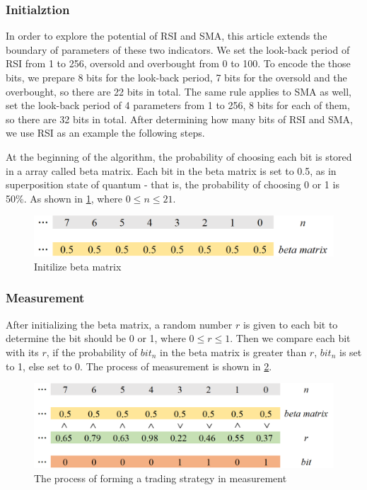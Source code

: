 \documentclass[../main.tex]{subfiles}
\begin{document}
\subsubsection{Initialztion}

In order to explore the potential of RSI and SMA, this article extends the boundary of parameters of these two indicators. We set the look-back period of RSI from 1 to 256, oversold and overbought from 0 to 100. To encode the those bits, we prepare 8 bits for the look-back period, 7 bits for the oversold and the overbought, so there are 22 bits in total. The same rule applies to SMA as well, set the look-back period of 4 parameters from 1 to 256, 8 bits for each of them, so there are 32 bits in total. After determining how many bits of RSI and SMA, we use RSI as an example the following steps.

\bigbreak

At the beginning of the algorithm, the probability of choosing each bit is stored in a array called beta matrix. Each bit in the beta matrix is set to 0.5, as in superposition state of quantum - that is, the probability of choosing 0 or 1 is 50\%. As shown in \ref{init}, where $0 \leq n \leq 21$.

\begin{figure}[H]
    \centering
    \includegraphics[scale = 0.5] {figure/init.png}
    \caption{Initilize beta matrix}
    \label{init}
\end{figure}

\subsubsection{Measurement}

After initializing the beta matrix, a random number $r$ is given to each bit to determine the bit should be 0 or 1, where $0 \leq r \leq 1$. Then we compare each bit with its $r$, if the probability of $bit_{n}$ in the beta matrix is greater than $r$, $bit_{n}$ is set to 1, else set to 0. The process of measurement is shown in \ref{measure}.

\bigbreak

\begin{figure}[H]
    \centering
    \includegraphics[scale = 0.5] {figure/measure.png}
    \caption{The process of forming a trading strategy in measurement}
    \label{measure}
\end{figure}
\end{document}
